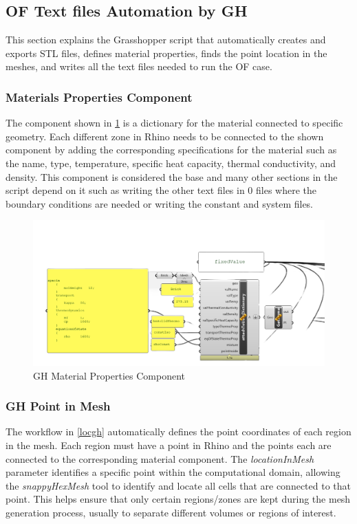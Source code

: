 \subsection{OF Text files Automation by GH}   
This section explains the Grasshopper script that automatically creates and exports STL files, defines material properties, finds the point location in the meshes, and writes all the text files needed to run the OF case.

\subsubsection{Materials Properties Component}
The component shown in \ref{matgh} is a dictionary for the material connected to specific geometry. Each different zone in Rhino needs to be connected to the shown component by adding the corresponding specifications for the material such as the name, type, temperature, specific heat capacity, thermal conductivity, and density. This component is considered the base and many other sections in the script depend on it such as writing the other text files in 0 files where the boundary conditions are needed or writing the constant and system files. 


\begin{figure}[H]
\centering
\includegraphics[width=0.77\columnwidth]{Figures/materialgh.png}
\hspace{0.7cm}
\caption{GH Material Properties Component}
\label{matgh}
\end{figure}





\subsubsection{GH Point in Mesh}
The workflow in \ref{locgh} automatically defines the point coordinates of each region in the mesh. Each region must have a point in Rhino and the points each are connected to the corresponding material component. The \textit{locationInMesh} parameter identifies a specific point within the computational domain, allowing the \textit{snappyHexMesh} tool to identify and locate all cells that are connected to that point. This helps ensure that only certain regions/zones are kept during the mesh generation process, usually to separate different volumes or regions of interest.

